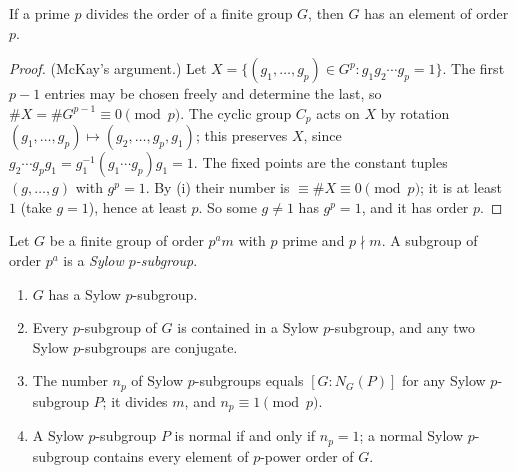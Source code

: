 \begin{theorem}[Cauchy]\label{thm:groups:cauchy}
If a prime $p$ divides the order of a finite group $G$, then $G$ has an element of order $p$.
\end{theorem}

\begin{proof}
(McKay's argument.) Let $X=\{(g_1,\dots,g_p)\in G^p:g_1g_2\cdots g_p=1\}$. The first $p-1$ entries may be chosen freely and determine the last, so
$\#X=\#G^{p-1}\equiv0\pmod p$. The cyclic group $C_p$ acts on $X$ by rotation $(g_1,\dots,g_p)\mapsto(g_2,\dots,g_p,g_1)$; this preserves $X$, since
$g_2\cdots g_pg_1=g_1^{-1}(g_1\cdots g_p)g_1=1$. The fixed points are the constant tuples $(g,\dots,g)$ with $g^p=1$. By
(i) their number is $\equiv\#X\equiv0\pmod p$; it is at least $1$ (take $g=1$), hence at least $p$. So some $g\ne1$ has
$g^p=1$, and it has order $p$.
\end{proof}

\begin{theorem}[Sylow]\label{thm:groups:sylow}
Let $G$ be a finite group of order $p^am$ with $p$ prime and $p\nmid m$. A subgroup of order $p^a$ is a \emph{Sylow $p$-subgroup}.
\begin{enumerate}[label=(\roman*)]
\item $G$ has a Sylow $p$-subgroup.
\item Every $p$-subgroup of $G$ is contained in a Sylow $p$-subgroup, and any two Sylow $p$-subgroups are conjugate.
\item The number $n_p$ of Sylow $p$-subgroups equals $[G:N_G(P)]$ for any Sylow $p$-subgroup $P$; it divides $m$, and $n_p\equiv1\pmod p$.
\item A Sylow $p$-subgroup $P$ is normal if and only if $n_p=1$; a normal Sylow $p$-subgroup contains every element of $p$-power order of $G$.
\end{enumerate}
\end{theorem}

